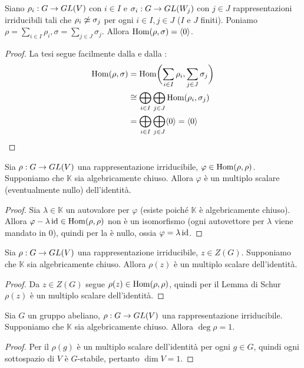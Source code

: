 \begin{corollary}
Siano $\rho_i:G\to GL(V)$ con $i\in I$ e $\sigma_i:G\to GL(W_j)$ con $j\in J$ rappresentazioni irriducibili tali che $\rho_i\not\simeq\sigma_j$ per ogni $i\in I\comma j\in J$ ($I$ e $J$ finiti). Poniamo $\rho=\sum_{i\in I}\rho_i\comma\sigma=\sum_{j\in J}\sigma_j$. Allora $\operatorname{Hom}(\rho,\sigma)=\langle 0\rangle$.
\end{corollary}
\begin{proof}
La tesi segue facilmente dalla  e dalla :
\begin{align*}
\operatorname{Hom}(\rho,\sigma)&=\operatorname{Hom}\biggl(\sum_{i\in I}\rho_i,\sum_{j\in J}\sigma_j\biggr)\\
&\cong\bigoplus_{i\in I}\bigoplus_{j\in J}\operatorname{Hom}(\rho_i,\sigma_j)\\
&=\bigoplus_{i\in I}\bigoplus_{j\in J}\langle 0\rangle=\langle 0\rangle
\end{align*}
\end{proof}

\begin{proposition}
Sia $\rho:G\to GL(V)$ una rappresentazione irriducibile, $\varphi\in\operatorname{Hom}(\rho,\rho)$. Supponiamo che $\mathbb{K}$ sia algebricamente chiuso. Allora $\varphi$ è un multiplo scalare (eventualmente nullo) dell'identità.
\end{proposition}
\begin{proof}
Sia $\lambda\in\mathbb{K}$ un autovalore per $\varphi$ (esiste poiché $\mathbb{K}$ è algebricamente chiuso). Allora $\varphi-\lambda\operatorname{id}\in\operatorname{Hom}(\rho,\rho)$ non è un isomorfismo (ogni autovettore per $\lambda$ viene mandato in 0), quindi per la  è nullo, ossia $\varphi=\lambda\operatorname{id}$.
\end{proof}

\begin{corollary}
Sia $\rho:G\to GL(V)$ una rappresentazione irriducibile, $z\in Z(G)$. Supponiamo che $\mathbb{K}$ sia algebricamente chiuso. Allora $\rho(z)$ è un multiplo scalare dell'identità.
\end{corollary}
\begin{proof}
Da $z\in Z(G)$ segue $\rho(z)\in\operatorname{Hom}(\rho,\rho)$, quindi per il Lemma di Schur $\rho(z)$ è un multiplo scalare dell'identità.
\end{proof}

\begin{corollary}
Sia $G$ un gruppo abeliano, $\rho:G\to GL(V)$ una rappresentazione irriducibile. Supponiamo che $\mathbb{K}$ sia algebricamente chiuso. Allora $\deg\rho=1$.
\end{corollary}
\begin{proof}
Per il  $\rho(g)$ è un multiplo scalare dell'identità per ogni $g\in G$, quindi ogni sottospazio di $V$ è $G$-stabile, pertanto $\dim V=1$.
\end{proof}

